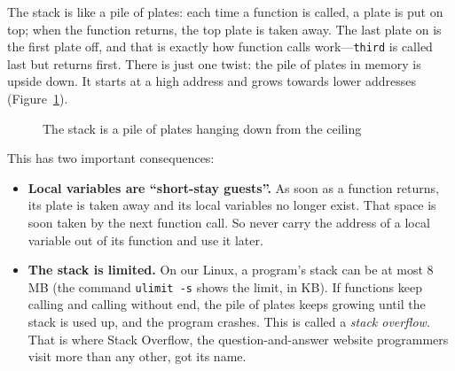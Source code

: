 The stack is like a pile of plates: each time a function is called, a plate is put on top; when the function returns, the top plate is taken away. The last plate on is the first plate off, and that is exactly how function calls work---\texttt{third} is called last but returns first. There is just one twist: the pile of plates in memory is upside down. It starts at a high address and grows towards lower addresses (Figure~\ref{fig:plates}).

\begin{figure}[htbp]
  \centering
  \caption{The stack is a pile of plates hanging down from the ceiling}
  \label{fig:plates}
\end{figure}

This has two important consequences:
\begin{itemize}
  \item \textbf{Local variables are ``short-stay guests''.} As soon as a function returns, its plate is taken away and its local variables no longer exist. That space is soon taken by the next function call. So never carry the address of a local variable out of its function and use it later.
  \item \textbf{The stack is limited.} On our Linux, a program's stack can be at most 8\,MB (the command \texttt{ulimit -s} shows the limit, in KB). If functions keep calling and calling without end, the pile of plates keeps growing until the stack is used up, and the program crashes. This is called a \emph{stack overflow}. That is where Stack Overflow, the question-and-answer website programmers visit more than any other, got its name.
\end{itemize}

